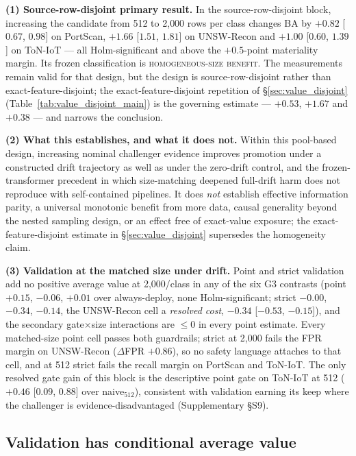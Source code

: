 \documentclass[journal]{IEEEtran}
\begin{document}
\textbf{(1) Source-row-disjoint primary result.} In the source-row-disjoint block, increasing the candidate from 512 to 2{,}000 rows per class changes BA by $+0.82$ [$0.67$, $0.98$] on PortScan, $+1.66$ [$1.51$, $1.81$] on UNSW-Recon and $+1.00$ [$0.60$, $1.39$] on ToN-IoT --- all Holm-significant and above the $+0.5$-point materiality margin. Its frozen classification is \textsc{homogeneous-size benefit}. The measurements remain valid for that design, but the design is source-row-disjoint rather than exact-feature-disjoint; the exact-feature-disjoint repetition of \S\ref{sec:value_disjoint} (Table~\ref{tab:value_disjoint_main}) is the governing estimate --- $+0.53$, $+1.67$ and $+0.38$ --- and narrows the conclusion.

\textbf{(2) What this establishes, and what it does not.} Within this pool-based design, increasing nominal challenger evidence improves promotion under a constructed drift trajectory as well as under the zero-drift control, and the frozen-transformer precedent in which size-matching deepened full-drift harm does not reproduce with self-contained pipelines. It does \emph{not} establish effective information parity, a universal monotonic benefit from more data, causal generality beyond the nested sampling design, or an effect free of exact-value exposure; the exact-feature-disjoint estimate in \S\ref{sec:value_disjoint} supersedes the homogeneity claim.



\textbf{(3) Validation at the matched size under drift.} Point and strict validation add no positive average value at 2{,}000/class in any of the six G3 contrasts (point $+0.15$, $-0.06$, $+0.01$ over always-deploy, none Holm-significant; strict $-0.00$, $-0.34$, $-0.14$, the UNSW-Recon cell a \emph{resolved cost}, $-0.34$ [$-0.53$, $-0.15$]), and the secondary gate$\times$size interactions are $\le 0$ in every point estimate. Every matched-size point cell passes both guardrails; strict at 2{,}000 fails the FPR margin on UNSW-Recon ($\Delta$FPR $+0.86$), so no safety language attaches to that cell, and at 512 strict fails the recall margin on PortScan and ToN-IoT. The only resolved gate gain of this block is the descriptive point gate on ToN-IoT at 512 ($+0.46$ [$0.09$, $0.88$] over naive$_{512}$), consistent with validation earning its keep where the challenger is evidence-disadvantaged (Supplementary \S S9).

\subsection{Validation has conditional average value}
\label{sec:gatevalue}
\end{document}
